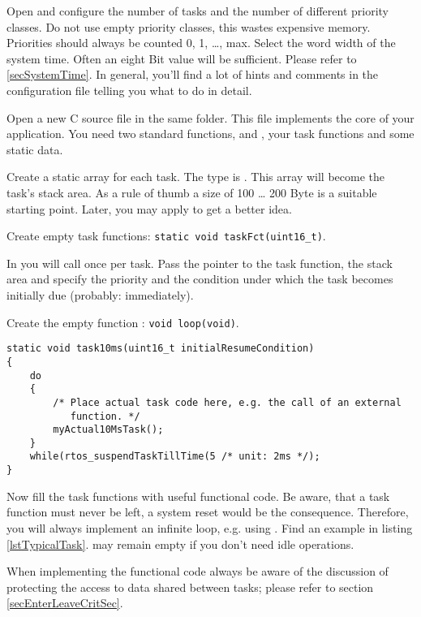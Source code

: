 Open  and configure the number of tasks and the
number of different priority classes. Do not use empty priority classes,
this wastes expensive memory. Priorities should always be counted 0, 1,
\ldots{}, max. Select the word width of the system time. Often an eight Bit
value will be sufficient. Please refer to \ref{secSystemTime}. In
general, you'll find a lot of hints and comments in the configuration file
telling you what to do in detail.

Open a new C source file in the same folder. This file implements the core
of your application. You need two standard functions,  and
, your task functions and some static data.

Create a static array for each task. The type is . This
array will become the task's stack area. As a rule of thumb a size of 100
\ldots{} 200 Byte is a suitable starting point. Later, you may apply
 to get a better idea.

Create empty task functions: \verb+static void taskFct(uint16_t)+.

In  you will call  once per task.
Pass the pointer to the task function, the stack area and specify the
priority and the condition under which the task becomes initially due
(probably: immediately).

Create the empty function : \verb+void loop(void)+.

\begin{lstlisting}[float, caption={Typical task, regularly activated},
label=lstTypicalTask, captionpos=b]
static void task10ms(uint16_t initialResumeCondition)
{
    do
    {
        /* Place actual task code here, e.g. the call of an external
           function. */
        myActual10MsTask();
    }
    while(rtos_suspendTaskTillTime(5 /* unit: 2ms */);
}
\end{lstlisting}


Now fill the task functions with useful functional code. Be aware,
that a task function must never be left, a system reset would be the
consequence. Therefore, you will always implement an infinite loop, e.g.
using . Find an example in listing
\ref{lstTypicalTask}.  may remain empty if you don't need idle
operations.

When implementing the functional code always be aware of the discussion of
protecting the access to data shared between tasks; please refer to
section \ref{secEnterLeaveCritSec}.

